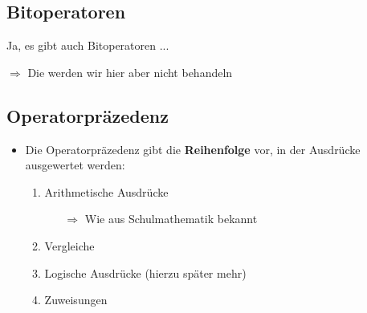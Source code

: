 \subsection{Bitoperatoren}
\begin{frame}
    \slidehead
    Ja, es gibt auch Bitoperatoren ...

    $\Rightarrow$ Die werden wir hier aber nicht behandeln
\end{frame}

\livecoding

\subsection{Operatorpräzedenz}
\begin{frame}
    \slidehead

    \pause
    \pause
    \begin{itemize}
        \item Die Operatorpräzedenz gibt die \textbf{Reihenfolge} vor, in der Ausdrücke ausgewertet werden:
            \begin{enumerate}
                \item Arithmetische Ausdrücke
                    \begin{itemize}
                        \item[$\Rightarrow$] Wie aus Schulmathematik bekannt
                    \end{itemize}
                \item Vergleiche
                \item Logische Ausdrücke (hierzu später mehr)
                \item Zuweisungen
            \end{enumerate}
    \end{itemize}
\end{frame}

%


